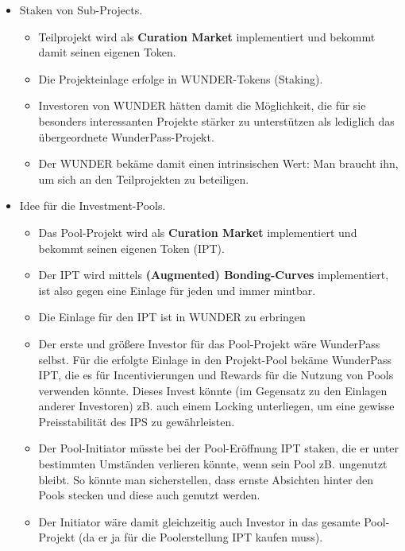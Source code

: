 
\begin{itemize}
  \item Staken von Sub-Projects. 
  \begin{itemize}
  	\item Teilprojekt wird als \textbf{Curation Market} implementiert und bekommt damit seinen eigenen Token.
  	\item Die Projekteinlage erfolge in WUNDER-Tokens (Staking).
  	\item Investoren von WUNDER hätten damit die Möglichkeit, die für sie besonders interessanten Projekte stärker zu unterstützen als lediglich das übergeordnete WunderPass-Projekt.
  	\item Der WUNDER bekäme damit einen intrinsischen Wert: Man braucht ihn, um sich an den Teilprojekten zu beteiligen.
  \end{itemize}
  \item Idee für die Investment-Pools. 
  \begin{itemize}
  	\item Das Pool-Projekt wird als \textbf{Curation Market} implementiert und bekommt seinen eigenen Token (IPT).
  	\item Der IPT wird mittels \textbf{(Augmented) Bonding-Curves} implementiert, ist also gegen eine Einlage für jeden und immer mintbar.
  	\item Die Einlage für den IPT ist in WUNDER zu erbringen 
  	\item Der erste und größere Investor für das Pool-Projekt wäre WunderPass selbst. Für die erfolgte Einlage in den Projekt-Pool bekäme WunderPass IPT, die es für Incentivierungen und Rewards für die Nutzung von Pools verwenden könnte. Dieses Invest könnte (im Gegensatz zu den Einlagen anderer Investoren) zB. auch einem Locking unterliegen, um eine gewisse Preisstabilität des IPS zu gewährleisten.
  	\item Der Pool-Initiator müsste bei der Pool-Eröffnung IPT staken, die er unter bestimmten Umständen verlieren könnte, wenn sein Pool zB. ungenutzt bleibt. So könnte man sicherstellen, dass ernste Absichten hinter den Pools stecken und diese auch genutzt werden. 
  	\item Der Initiator wäre damit gleichzeitig auch Investor in das gesamte Pool-Projekt (da er ja für die Poolerstellung IPT kaufen muss).

\end{itemize}
\end{itemize}

